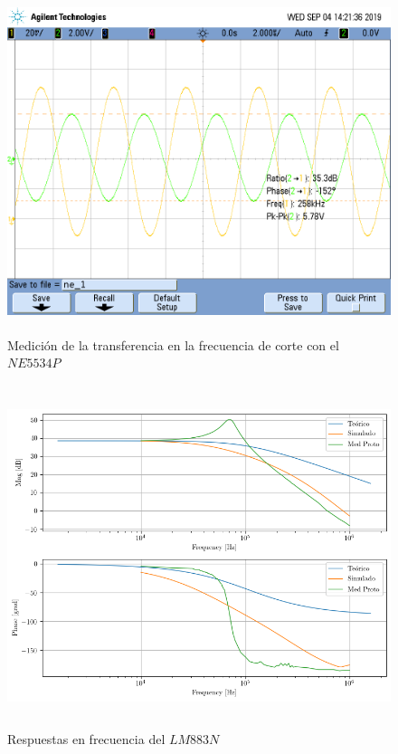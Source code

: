 \begin{figure}
\begin{center}
\includegraphics[height=10cm]{../Ex2/Informe/rsc/ne_1.png}
\caption{Medición de la transferencia en la frecuencia de corte con el $NE5534P$}
\label{fig:e2_ne_fB}
\end{center}
\end{figure}

\begin{figure}
\begin{center}
\includegraphics[height=10cm]{../Ex2/Informe/rsc/lm_bode_proto.png}
\caption{Respuestas en frecuencia del $LM883N$}
\label{fig:e2_lm_bode}
\end{center}
\end{figure}

